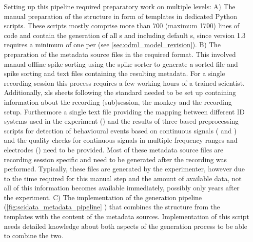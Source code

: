 Setting up this pipeline required preparatory work on multiple levels:
A) The manual preparation of the  structure in form of  templates in dedicated Python scripts. These scripts mostly comprise more than 700 (maximum 1700) lines of code and contain the generation of all  s and  including default s, since  version 1.3 requires a minimum of one  per  (see \cref{sec:odml_model_revision}). 
B) The preparation of the metadata source files in the required format. This involved manual offline spike sorting using the  spike sorter to generate a sorted  file and spike sorting  and text files containing the resulting metadata. For a single recording session this process requires a few working hours of a trained scientist. Additionally, xls sheets following the  standard needed to be set up containing information about the recording (sub)session, the monkey and the recording setup. Furthermore a single text file providing the mapping between different ID systems used in the experiment () and the results of three  based preprocessing scripts for detection of behavioural events based on continuous signals ( and ) and the quality checks for continuous signals in multiple frequency ranges and electrodes () need to be provided. Most of these metadata source files are recording session specific and need to be generated after the recording was performed. Typically, these files are generated by the experimenter, however due to the time required for this manual step and the amount of available data, not all of this information becomes available immediately, possibly only years after the experiment.
C) The implementation of the  generation pipeline (\cref{fig:scidata_metadata_pipeline} ) that combines the  structure from the templates with the content of the metadata sources. Implementation of this script needs detailed knowledge about both aspects of the  generation process to be able to combine the two.

